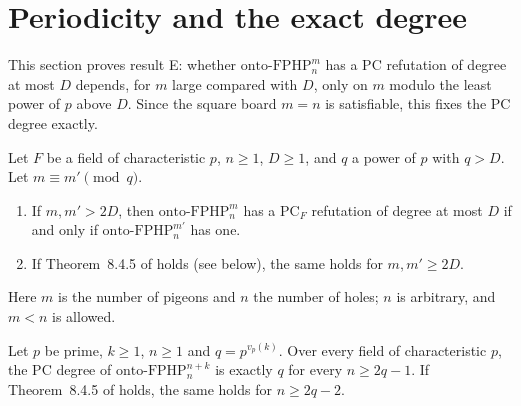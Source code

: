 
\section{Periodicity and the exact degree}\label{sec:periodicity}

This section proves result E: whether $\mathrm{onto\text{-}FPHP}^{m}_n$ has a PC refutation of
degree at most $D$ depends, for $m$ large compared with $D$, only on $m$ modulo the least
power of $p$ above $D$.  Since the square board $m=n$ is satisfiable, this fixes the PC degree
exactly.

\begin{theorem}[periodicity]\label{thm:periodicity}
Let $F$ be a field of characteristic $p$, $n\ge1$, $D\ge1$, and $q$ a power of $p$ with
$q>D$.  Let $m\equiv m'\pmod q$.
\begin{enumerate}
\item[(a)] If $m,m'>2D$, then $\mathrm{onto\text{-}FPHP}^{m}_n$ has a $\mathrm{PC}_F$
  refutation of degree at most $D$ if and only if $\mathrm{onto\text{-}FPHP}^{m'}_n$ has one.
\item[(b)] If Theorem~8.4.5 of \cite{hone2025} holds (see below), the same holds for
  $m,m'\ge2D$.
\end{enumerate}
\end{theorem}

Here $m$ is the number of pigeons and $n$ the number of holes; $n$ is arbitrary, and $m<n$ is
allowed.

\begin{corollary}\label{cor:exact}
Let $p$ be prime, $k\ge1$, $n\ge1$ and $q=p^{v_p(k)}$.  Over every field of characteristic
$p$, the PC degree of $\mathrm{onto\text{-}FPHP}^{n+k}_n$ is exactly $q$ for every
$n\ge2q-1$.  If Theorem~8.4.5 of \cite{hone2025} holds, the same holds for $n\ge2q-2$.
\end{corollary}

